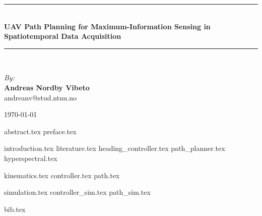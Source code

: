 \documentclass{article}
\newcommand{\HRule}{\rule{\linewidth}{0.5mm}}
\numberwithin{equation}{section}
\begin{document}
\begin{center}
\HRule \\[0.4cm]
{ \huge \bfseries UAV Path Planning for Maximum-Information Sensing in Spatiotemporal Data Acquisition}
\HRule \\[1.5cm]

\begin{center} \large
\emph{By:}\\
\textbf{Andreas Nordby Vibeto}\\
andreanv@stud.ntnu.no
\end{center}

\vfill

{\large \monthyear\today}

\end{center}
\newpage

{abstract.tex}
\newpage
{preface.tex}
\newpage

\tableofcontents

\newpage

\pagestyle{fancy}
{introduction.tex}
\newpage
{literature.tex}
{heading_controller.tex}
{path_planner.tex}
{hyperspectral.tex}

{kinematics.tex}
{controller.tex}
{path.tex}

{simulation.tex}
{controller_sim.tex}
{path_sim.tex}


\newpage
{bib.tex}
\end{document}
